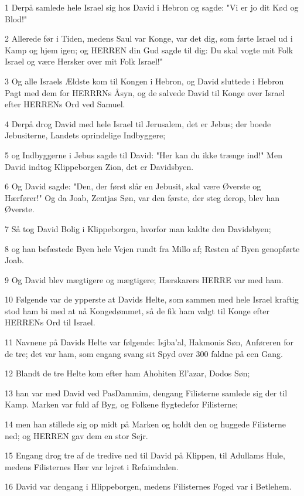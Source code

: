 \par 1 Derpå samlede hele Israel sig hos David i Hebron og sagde: "Vi er jo dit Kød og Blod!"
\par 2 Allerede før i Tiden, medens Saul var Konge, var det dig, som førte Israel ud i Kamp og hjem igen; og HERREN din Gud sagde til dig: Du skal vogte mit Folk Israel og være Hersker over mit Folk Israel!"
\par 3 Og alle Israels Ældste kom til Kongen i Hebron, og David sluttede i Hebron Pagt med dem for HERRRNs Åsyn, og de salvede David til Konge over Israel efter HERRENs Ord ved Samuel.
\par 4 Derpå drog David med hele Israel til Jerusalem, det er Jebus; der boede Jebusiterne, Landets oprindelige Indbyggere;
\par 5 og Indbyggerne i Jebus sagde til David: "Her kan du ikke trænge ind!" Men David indtog Klippeborgen Zion, det er Davidsbyen.
\par 6 Og David sagde: "Den, der først slår en Jebusit, skal være Øverste og Hærfører!" Og da Joab, Zentjas Søn, var den første, der steg derop, blev han Øverste.
\par 7 Så tog David Bolig i Klippeborgen, hvorfor man kaldte den Davidsbyen;
\par 8 og han befæstede Byen hele Vejen rundt fra Millo af; Resten af Byen genopførte Joab.
\par 9 Og David blev mægtigere og mægtigere; Hærskarers HERRE var med ham.
\par 10 Følgende var de ypperste at Davids Helte, som sammen med hele Israel kraftig stod ham bi med at nå Kongedømmet, så de fik ham valgt til Konge efter HERRENs Ord til Israel.
\par 11 Navnene på Davids Helte var følgende: Isjba'al, Hakmonis Søn, Anføreren for de tre; det var ham, som engang svang sit Spyd over 300 faldne på een Gang.
\par 12 Blandt de tre Helte kom efter ham Ahohiten El'azar, Dodos Søn;
\par 13 han var med David ved PasDammim, dengang Filisterne samlede sig der til Kamp. Marken var fuld af Byg, og Folkene flygtedefor Filisterne;
\par 14 men han stillede sig op midt på Marken og holdt den og huggede Filisterne ned; og HERREN gav dem en stor Sejr.
\par 15 Engang drog tre af de tredive ned til David på Klippen, til Adullams Hule, medens Filisternes Hær var lejret i Refaimdalen.
\par 16 David var dengang i Hlippeborgen, medens Filisternes Foged var i Betlehem.
